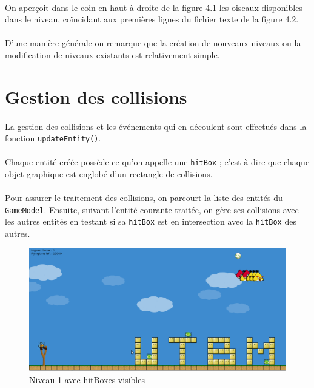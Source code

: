 \documentclass[a4paper,12pt]{report}
\begin{document}
\paragraph{}On aperçoit dans le coin en haut à droite de la figure 4.1 les oiseaux disponibles dans le niveau, coïncidant aux premières lignes du fichier texte de la figure 4.2.

\paragraph{}D'une manière générale on remarque que la création de nouveaux niveaux ou la modification de niveaux existants est relativement simple.

\section{Gestion des collisions}

\paragraph{}La gestion des collisions et les événements qui en découlent sont effectués dans la fonction \verb+updateEntity()+.

\paragraph{}Chaque entité créée possède ce qu'on appelle une \verb+hitBox+ ; c'est-à-dire que chaque objet graphique est englobé d'un rectangle de collisions. 

\paragraph{}Pour assurer le traitement des collisions, on parcourt la liste des entités du \verb+GameModel+. Ensuite, suivant l'entité courante traitée, on gère ses collisions avec les autres entités en testant si sa \verb+hitBox+ est en intersection avec la \verb+hitBox+ des autres.

\begin{figure}[H]
\begin{center}
\includegraphics[scale=0.35]{images/lvl01hitbox.png} 
\end{center}
\caption{Niveau 1 avec hitBoxes visibles}
\label{Niveau 1 avec hitBoxes visibles}
\end{figure}
\end{document}
